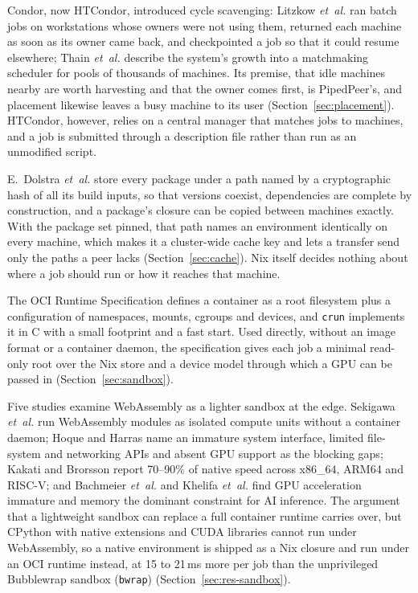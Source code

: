 Condor, now HTCondor, introduced cycle scavenging: Litzkow \textit{et~al.}
\cite{litzkow1988condor} ran batch jobs on workstations whose owners were not
using them, returned each machine as soon as its owner came back, and
checkpointed a job so that it could resume elsewhere; Thain \textit{et~al.}
\cite{thain2005condor} describe the system's growth into a matchmaking scheduler
for pools of thousands of machines. Its premise, that idle machines nearby are
worth harvesting and that the owner comes first, is PipedPeer's, and placement
likewise leaves a busy machine to its user (Section~\ref{sec:placement}).
HTCondor, however, relies on a central manager that matches jobs to machines,
and a job is submitted through a description file rather than run as an
unmodified script.

E.~Dolstra \textit{et~al.} \cite{dolstra2004nix} store every package under
a path named by a cryptographic hash of all its build inputs, so that versions
coexist, dependencies are complete by construction, and a package's closure can
be copied between machines exactly. With the package set pinned, that path
names an environment identically on every machine, which makes it a
cluster-wide cache key and lets a transfer send only the paths a peer lacks
(Section~\ref{sec:cache}). Nix itself decides nothing about where a job should
run or how it reaches that machine.

The OCI Runtime Specification \cite{oci2021} defines a container as a root
filesystem plus a configuration of namespaces, mounts, cgroups and devices, and
\texttt{crun} \cite{crun} implements it in C with a small footprint and a fast
start. Used directly, without an image format or a container daemon, the
specification gives each job a minimal read-only root over the Nix store and a
device model through which a GPU can be passed in (Section~\ref{sec:sandbox}).

Five studies examine WebAssembly as a lighter sandbox at the edge. Sekigawa
\textit{et~al.} \cite{sekigawa2023} run WebAssembly modules as isolated compute
units without a container daemon; Hoque and Harras \cite{hoque2022} name an
immature system interface, limited file-system and networking APIs and absent
GPU support as the blocking gaps; Kakati and Brorsson \cite{kakati2024} report
70--90\% of native speed across x86\_64, ARM64 and \mbox{RISC-V}; and Bachmeier
\textit{et~al.} \cite{bachmeier2025} and Khelifa \textit{et~al.}
\cite{khelifa2024} find GPU acceleration immature and memory the dominant
constraint for AI inference. The argument that a lightweight sandbox can replace
a full container runtime carries over, but CPython with native extensions and
CUDA libraries cannot run under WebAssembly, so a native environment is shipped
as a Nix closure and run under an OCI runtime instead, at 15 to 21\,ms more per
job than the unprivileged Bubblewrap sandbox (\texttt{bwrap}) \cite{bubblewrap}
(Section~\ref{sec:res-sandbox}).

